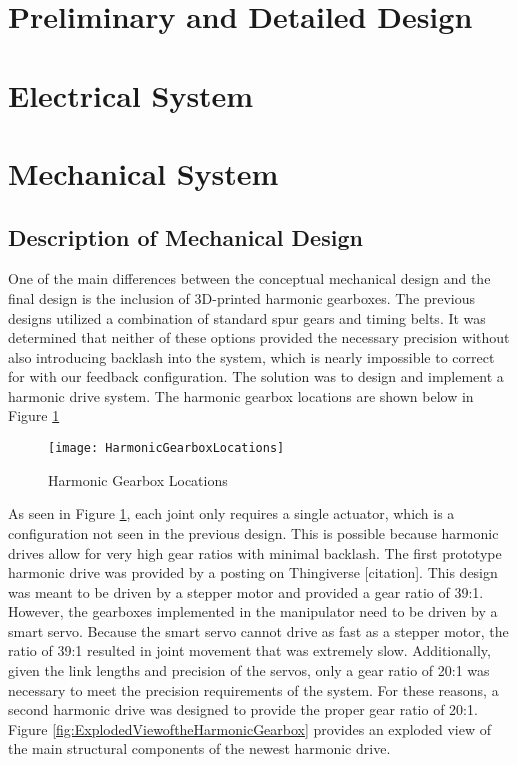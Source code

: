 \section*{Preliminary and Detailed Design}
\section{Electrical System}
\section{Mechanical System}
\subsection*{Description of Mechanical Design}
One of the main differences between the conceptual mechanical design and the final design is the inclusion of 3D-printed harmonic gearboxes. The previous designs utilized a combination of standard spur gears and timing belts. It was determined that neither of these options provided the necessary precision without also introducing backlash into the system, which is nearly impossible to correct for with our feedback configuration. The solution was to design and implement a harmonic drive system. The harmonic gearbox locations are shown below in Figure \ref{fig:HarmonicGearboxLocations}

\begin{figure}[htp]
  \centering
  \texttt{[image: HarmonicGearboxLocations]}
  \caption{Harmonic Gearbox Locations}
  \label{fig:HarmonicGearboxLocations}
\end{figure}

As seen in Figure \ref{fig:HarmonicGearboxLocations}, each joint only requires a single actuator, which is a configuration not seen in the previous design. This is possible because harmonic drives allow for very high gear ratios with minimal backlash. The first prototype harmonic drive was provided by a posting on Thingiverse [citation]. This design was meant to be driven by a stepper motor and provided a gear ratio of 39:1. However, the gearboxes implemented in the manipulator need to be driven by a smart servo. Because the smart servo cannot drive as fast as a stepper motor, the ratio of 39:1 resulted in joint movement that was extremely slow. Additionally, given the link lengths and precision of the servos, only a gear ratio of 20:1 was necessary to meet the precision requirements of the system. For these reasons, a second harmonic drive was designed to provide the proper gear ratio of 20:1. Figure \ref{fig:ExplodedViewoftheHarmonicGearbox} provides an exploded view of the main structural components of the newest harmonic drive.

